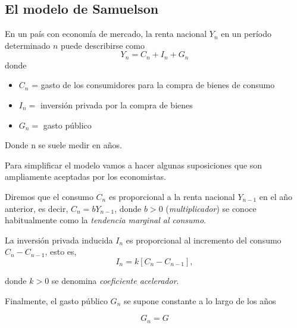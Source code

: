 \subsection{El modelo de Samuelson}

En un país con economía de mercado, la renta nacional $Y_{n}$ en un
        período determinado $n$ puede describirse como
        $$Y_{n} = C_{n} + I_{n} + G_{n}$$
        donde
        \begin{itemize}
        \item $C_{n}$ = gasto de los consumidores para la compra de bienes de
          consumo
        \item $I_{n} = $ inversión privada por la compra de bienes
        \item $G_{n} = $ gasto público
        \end{itemize}

        Donde n se suele medir en años.

        Para simplificar el modelo vamos a hacer algunas suposiciones que son
        ampliamente aceptadas por los economistas.

        Diremos que el consumo $C_{n}$ es proporcional a la renta nacional
        $Y_{n-1}$ en el año anterior, es decir, $C_{n} = bY_{n-1}$, donde $b >
        0$ (\textit{multiplicador}) se conoce habitualmente como la
        \textit{tendencia marginal al consumo}.

        La inversión privada inducida $I_{n}$ es proporcional al incremento del
        consumo $C_{n} - C_{n-1}$, esto es,
        $$I_{n} = k[C_{n} - C_{n-1}],$$

        donde $k > 0$ se denomina \textit{coeficiente acelerador}.

        Finalmente, el gasto público $G_{n}$ se supone constante a lo largo de
        los años

        $$ G_{n} = G $$

